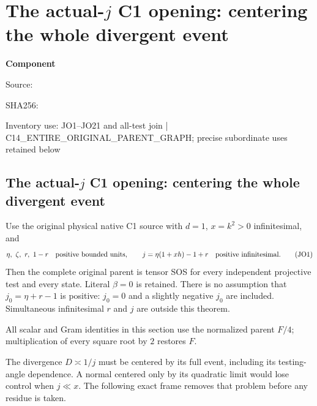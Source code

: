 \chapter{The actual-$j$ C1 opening: centering the whole divergent event}
\label{component:p48da253a150f}
\noindent\textbf{Component }\par
{\small\noindent Source: \par}
{\small\noindent SHA256: \par}
{\small\noindent Inventory use: JO1--JO21 and all-test join | C14\_\allowbreak{}ENTIRE\_\allowbreak{}ORIGINAL\_\allowbreak{}PARENT\_\allowbreak{}GRAPH; precise subordinate uses retained below\par}
\medskip
\section{The actual-$j$ C1 opening: centering the whole divergent event}
\label{p48da253a150f:sec:r13-c1-j-opening}

\begin{theorem}
Use the original physical native C1 source with $d=1$, $x=k^2>0$
infinitesimal, and
\[
 \eta,\ \zeta,\ r,\ 1-r\quad\hbox{positive bounded units},\qquad
 j=\eta(1+xh)-1+r\quad\hbox{positive infinitesimal}.       \tag{JO1}
\]
Then the complete original parent is tensor SOS for every independent
projective test and every state. Literal $\beta=0$ is retained.
There is no assumption that $j_0=\eta+r-1$ is positive: $j_0=0$
and a slightly negative $j_0$ are included. Simultaneous infinitesimal
$r$ and $j$ are outside this theorem.
\end{theorem}

All scalar and Gram identities in this section use the normalized
parent $F/4$; multiplication of every square root by $2$ restores $F$.

The divergence $D\asymp1/j$ must be centered by its full event,
including its testing-angle dependence. A normal centered only by its
quadratic limit would lose control when $j\ll x$. The following exact
frame removes that problem before any residue is taken.

